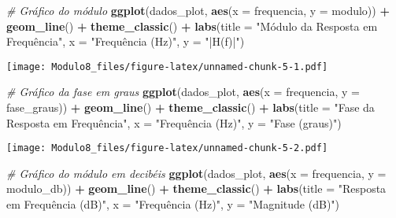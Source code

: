 \documentclass[
]{article}
\newenvironment{Shaded}{\begin{snugshade}}{\end{snugshade}}
\newcommand{\AttributeTok}[1]{\textcolor[rgb]{0.13,0.29,0.53}{#1}}
\newcommand{\CommentTok}[1]{\textcolor[rgb]{0.56,0.35,0.01}{\textit{#1}}}
\newcommand{\FunctionTok}[1]{\textcolor[rgb]{0.13,0.29,0.53}{\textbf{#1}}}
\newcommand{\NormalTok}[1]{#1}
\newcommand{\SpecialCharTok}[1]{\textcolor[rgb]{0.81,0.36,0.00}{\textbf{#1}}}
\newcommand{\StringTok}[1]{\textcolor[rgb]{0.31,0.60,0.02}{#1}}
\begin{document}
\begin{Shaded}
\begin{Highlighting}[]
\CommentTok{\# Gráfico do módulo}
\FunctionTok{ggplot}\NormalTok{(dados\_plot, }\FunctionTok{aes}\NormalTok{(}\AttributeTok{x =}\NormalTok{ frequencia, }\AttributeTok{y =}\NormalTok{ modulo)) }\SpecialCharTok{+}
  \FunctionTok{geom\_line}\NormalTok{() }\SpecialCharTok{+}
  \FunctionTok{theme\_classic}\NormalTok{() }\SpecialCharTok{+}
  \FunctionTok{labs}\NormalTok{(}\AttributeTok{title =} \StringTok{"Módulo da Resposta em Frequência"}\NormalTok{, }\AttributeTok{x =} \StringTok{"Frequência (Hz)"}\NormalTok{, }\AttributeTok{y =} \StringTok{"|H(f)|"}\NormalTok{)}
\end{Highlighting}
\end{Shaded}

\texttt{[image: Modulo8\_files/figure-latex/unnamed-chunk-5-1.pdf]}

\begin{Shaded}
\begin{Highlighting}[]
\CommentTok{\# Gráfico da fase em graus}
\FunctionTok{ggplot}\NormalTok{(dados\_plot, }\FunctionTok{aes}\NormalTok{(}\AttributeTok{x =}\NormalTok{ frequencia, }\AttributeTok{y =}\NormalTok{ fase\_graus)) }\SpecialCharTok{+}
  \FunctionTok{geom\_line}\NormalTok{() }\SpecialCharTok{+}
  \FunctionTok{theme\_classic}\NormalTok{() }\SpecialCharTok{+}
  \FunctionTok{labs}\NormalTok{(}\AttributeTok{title =} \StringTok{"Fase da Resposta em Frequência"}\NormalTok{, }\AttributeTok{x =} \StringTok{"Frequência (Hz)"}\NormalTok{, }\AttributeTok{y =} \StringTok{"Fase (graus)"}\NormalTok{)}
\end{Highlighting}
\end{Shaded}

\texttt{[image: Modulo8\_files/figure-latex/unnamed-chunk-5-2.pdf]}

\begin{Shaded}
\begin{Highlighting}[]
\CommentTok{\# Gráfico do módulo em decibéis}
\FunctionTok{ggplot}\NormalTok{(dados\_plot, }\FunctionTok{aes}\NormalTok{(}\AttributeTok{x =}\NormalTok{ frequencia, }\AttributeTok{y =}\NormalTok{ modulo\_db)) }\SpecialCharTok{+}
  \FunctionTok{geom\_line}\NormalTok{() }\SpecialCharTok{+}
  \FunctionTok{theme\_classic}\NormalTok{() }\SpecialCharTok{+}
  \FunctionTok{labs}\NormalTok{(}\AttributeTok{title =} \StringTok{"Resposta em Frequência (dB)"}\NormalTok{, }\AttributeTok{x =} \StringTok{"Frequência (Hz)"}\NormalTok{, }\AttributeTok{y =} \StringTok{"Magnitude (dB)"}\NormalTok{)}
\end{Highlighting}
\end{Shaded}
\end{document}
